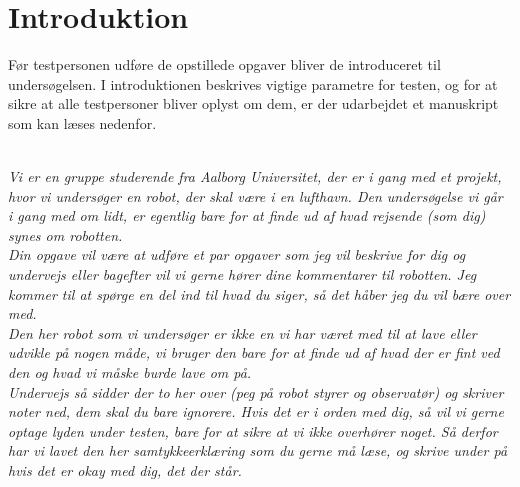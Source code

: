 \section{Introduktion}
\label{ParametreIntroduktion}
%
Før testpersonen udføre de opstillede opgaver bliver de introduceret til undersøgelsen. I introduktionen beskrives vigtige parametre for testen, og for at sikre at alle testpersoner bliver oplyst om dem, er der udarbejdet et manuskript som kan læses nedenfor. 
\\\\
\begin{center}
\textit{Vi er en gruppe studerende fra Aalborg Universitet, der er i gang med et projekt, hvor vi undersøger en robot, der skal være i en lufthavn. 
Den undersøgelse vi går i gang med om lidt, er egentlig bare for at finde ud af hvad rejsende (som dig) synes om robotten. \\
Din opgave vil være at udføre et par opgaver som jeg vil beskrive for dig og undervejs eller bagefter vil vi gerne hører dine kommentarer til robotten. 
Jeg kommer til at spørge en del ind til hvad du siger, så det håber jeg du vil bære over med. 
\\
Den her robot som vi undersøger er ikke en vi har været med til at lave eller udvikle på nogen måde, vi bruger den bare for at finde ud af hvad der er fint ved den og hvad vi måske burde lave om på. 
\\
Undervejs så sidder der to her over (peg på robot styrer og observatør) og skriver noter ned, dem skal du bare ignorere. 
Hvis det er i orden med dig, så vil vi gerne optage lyden under testen, bare for at sikre at vi ikke overhører noget. Så derfor har vi lavet den her samtykkeerklæring som du gerne må læse, og skrive under på hvis det er okay med dig, det der står.}
\end{center}
